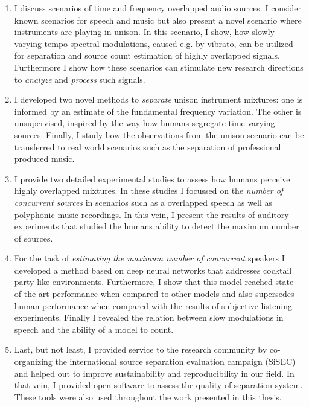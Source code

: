 \begin{enumerate}
\item I discuss scenarios of time and frequency overlapped audio sources.
I consider known scenarios for speech and music but also present a novel scenario where instruments are playing in unison.
In this scenario, I show, how slowly varying tempo-spectral modulations, caused e.g. by vibrato, can be utilized for separation and source count estimation of highly overlapped signals.
Furthermore I show how these scenarios can stimulate new research directions to \emph{analyze} and \emph{process} such signals.\\

\item I developed two novel methods to \emph{separate} unison instrument mixtures: one is informed by an estimate of the fundamental frequency variation.
The other is unsupervised, inspired by the way how humans segregate time-varying sources.
Finally, I study how the observations from the unison scenario can be transferred to real world scenarios such as the separation of professional produced music.\\

\item I provide two detailed experimental studies to assess how humans perceive highly overlapped mixtures.
In these studies I focussed on the \emph{number of concurrent sources} in scenarios such as a overlapped speech as well as polyphonic music recordings.
In this vein, I present the results of auditory experiments that studied the humans ability to detect the maximum number of sources.\\

\item For the task of \emph{estimating the maximum number of concurrent} speakers I developed a method based on deep neural networks that addresses cocktail party like environments.
Furthermore, I show that this model reached state-of-the art performance when compared to other models and also supersedes human performance when compared with the results of subjective listening experiments.
Finally I revealed the relation between slow modulations in speech and the ability of a model to count.\\

\item Last, but not least, I provided service to the research community by co-organizing the international source separation evaluation campaign (SiSEC) and helped out to improve sustainability and reproducibility in our field.
In that vein, I provided open software to assess the quality of separation system. 
These tools were also used throughout the work presented in this thesis.
\end{enumerate}

